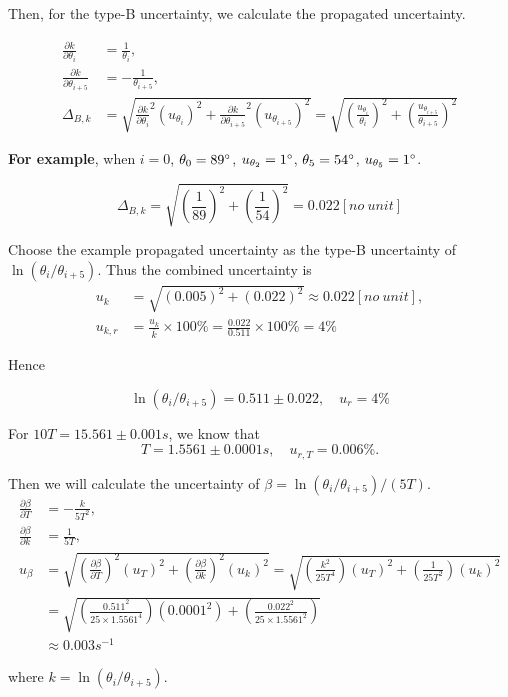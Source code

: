 Then, for the type-B uncertainty, we calculate the propagated uncertainty.

\[
\begin{split}
\frac{\partial k}{\partial \theta_{i}}&=\frac{1}{\theta_i},\\
\frac{\partial k}{\partial \theta_{i+5}}&=-\frac{1}{\theta_{i+5}},\\
\Delta_{B,k}&=\sqrt{\frac{\partial k}{\partial
    \theta_{i}}^2(u_{\theta_i})^2+\frac{\partial k}{\partial
    \theta_{i+5}}^2(u_{\theta_{i+5}})^2}
=\sqrt{(\frac{u_{\theta_i}}{\theta_i})^2+(\frac{u_{\theta_{i+5}}}{\theta_{i+5}})^2} 
\end{split}
\]

\textbf{For example}, when $i=0$, $\theta_0=89^\circ$, $u_{\theta_2}=1^\circ$,
$\theta_5=54^\circ$, $u_{\theta_5}=1^\circ$. 

\[
\Delta_{B,k}=\sqrt{(\frac{1}{89})^2+(\frac{1}{54})^2}=0.022[no\ unit]
\]

Choose the example propagated uncertainty as the type-B uncertainty of
$\ln(\theta_i/\theta_{i+5})$. Thus the combined uncertainty is 
\[
\begin{split}
u_{k}&=\sqrt{(0.005)^2+(0.022)^2}\approx0.022[no\ unit],\\
u_{k,r}&=\frac{u_k}{\bar{k}}\times100\%=\frac{0.022}{0.511}\times100\%=4\%
\end{split}
\]

Hence

\[
\ln(\theta_i/\theta_{i+5})=0.511\pm0.022, \quad u_r=4\%
\]

For $10T=15.561\pm0.001s$, we know that
\[
T=1.5561\pm0.0001s, \quad u_{r,T}=0.006\%.
\]

Then we will calculate the uncertainty of $\beta=\ln(\theta_i/\theta_{i+5})/(5T)$.
\[
\begin{split}
\frac{\partial \beta}{\partial T}&=-\frac{k}{5T^2},\\
\frac{\partial \beta}{\partial k}&=\frac{1}{5T},\\
u_{\beta}&=\sqrt{(\frac{\partial \beta}{\partial T})^2(u_T)^2+(\frac{\partial
    \beta}{\partial
    k})^2(u_k)^2}=\sqrt{(\frac{k^2}{25T^4})(u_T)^2+(\frac{1}{25T^2})(u_k)^2}\\ 
&=\sqrt{(\frac{0.511^2}{25\times1.5561^4})(0.0001^2)+(\frac{0.022^2}{25\times1.5561^2})}\\
&\approx0.003s^{-1}
\end{split}
\]

where $k=\ln(\theta_i/\theta_{i+5})$.

